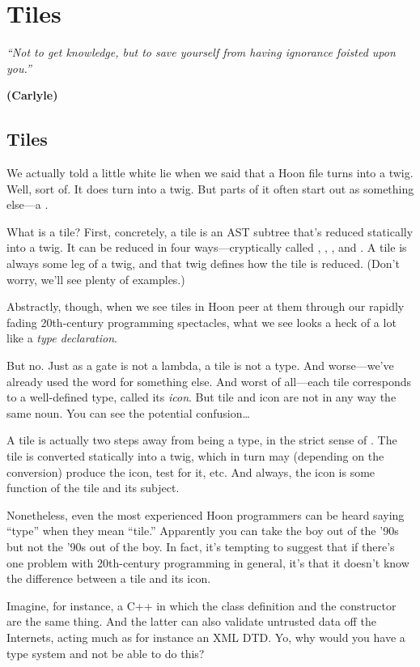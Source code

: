 \chapter{Tiles}

\emph{``Not to get knowledge, but to save yourself from having
ignorance foisted upon you.''}

\textbf{(Carlyle)}

\section{Tiles}

We actually told a little white lie when we said that a Hoon file
turns into a twig.  Well, sort of.  It does turn into a twig.
But parts of it often start out as something else---a .

What is a tile?  First, concretely, a tile is an AST subtree
that's reduced statically into a twig.  It can be reduced in four
ways---cryptically called , , , and .  A
tile is always some leg of a twig, and that twig defines how the
tile is reduced.  (Don't worry, we'll see plenty of examples.)

Abstractly, though, when we see tiles in Hoon peer at them
through our rapidly fading 20th-century programming spectacles,
what we see looks a heck of a lot like a \emph{type declaration}.  

But no.  Just as a gate is not a lambda, a tile is not a type.
And worse---we've already used the word  for something
else.  And worst of all---each tile corresponds to a well-defined
type, called its \emph{icon}.  But tile and icon are not in any way
the same noun.  You can see the potential confusion\ldots{}

A tile is actually two steps away from being a type, in the
strict sense of .  The tile is converted statically
into a twig, which in turn may (depending on the conversion)
produce the icon, test for it, etc.  And always, the icon is 
some function of the tile and its subject.

Nonetheless, even the most experienced Hoon programmers can be
heard saying ``type'' when they mean ``tile.''  Apparently you can
take the boy out of the '90s but not the '90s out of the boy.
In fact, it's tempting to suggest that if there's one problem
with 20th-century programming in general, it's that it doesn't
know the difference between a tile and its icon.

Imagine, for instance, a C++ in which the class definition and
the constructor are the same thing.  And the latter can also
validate untrusted data off the Internets, acting much as for
instance an XML DTD.  Yo, why would you have a type system and
not be able to do this?

